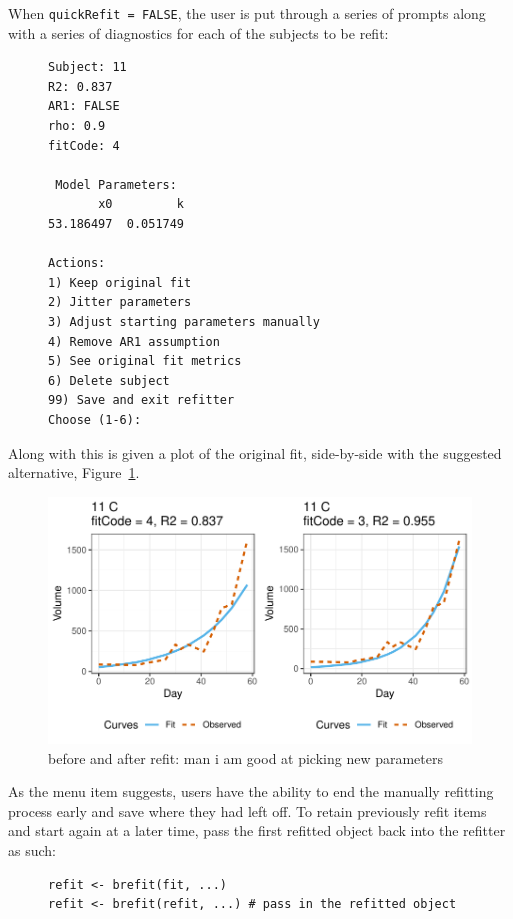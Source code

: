 \documentclass{article}
\begin{document}
When \texttt{quickRefit = FALSE}, the user is put through a series of prompts along with a series of diagnostics for each of the subjects to be refit:


\begin{singlespace}
\begin{figure}[H]
\centering
\begin{BVerbatim}
Subject: 11
R2: 0.837
AR1: FALSE
rho: 0.9
fitCode: 4

 Model Parameters:
       x0         k 
53.186497  0.051749 

Actions:
1) Keep original fit
2) Jitter parameters
3) Adjust starting parameters manually
4) Remove AR1 assumption
5) See original fit metrics
6) Delete subject
99) Save and exit refitter
Choose (1-6):
\end{BVerbatim}
\end{figure}
\end{singlespace}


Along with this is given a plot of the original fit, side-by-side with the suggested alternative, Figure~\ref{fig:refit_plot}. 

\begin{figure}[H]
\centering
\includegraphics{img/mouse_refit_plot.pdf}
\caption{before and after refit: man i am good at picking new parameters}
\label{fig:refit_plot}
\end{figure}

As the menu item suggests, users have the ability to end the manually refitting process early and save where they had left off. To retain previously refit items and start again at a later time, pass the first refitted object back into the refitter as such:

\begin{singlespace}
\begin{figure}[H]
\centering
\begin{BVerbatim}
refit <- brefit(fit, ...)
refit <- brefit(refit, ...) # pass in the refitted object
\end{BVerbatim}
\end{figure}
\end{singlespace}
\end{document}
